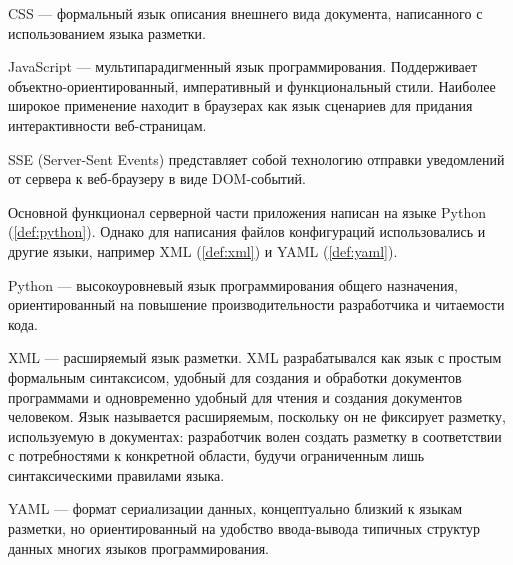 \begin{definition}
    \label{def:css}
    CSS — формальный язык описания внешнего вида документа, написанного с использованием языка разметки.
\end{definition}

\begin{definition}
    \label{def:js}
    JavaScript — мультипарадигменный язык программирования. Поддерживает объектно-ориентированный, императивный и
    функциональный стили. Наиболее широкое применение находит в браузерах как язык сценариев для придания интерактивности
    веб-страницам.
\end{definition}

\begin{definition}
    \label{def:sse}
    SSE (Server-Sent Events) представляет собой технологию отправки уведомлений от сервера к веб-браузеру в виде DOM-событий.
\end{definition}

\noindent Основной функционал серверной части приложения написан на языке Python (\ref{def:python}). Однако для написания
файлов конфигураций использовались и другие языки, например XML (\ref{def:xml}) и YAML (\ref{def:yaml}).

\begin{definition}
    \label{def:python}
    Python — высокоуровневый язык программирования общего назначения, ориентированный на повышение производительности
    разработчика и читаемости кода.
\end{definition}

\begin{definition}
    \label{def:xml}
    XML — расширяемый язык разметки. XML разрабатывался как язык с простым формальным синтаксисом, удобный для создания
    и обработки документов программами и одновременно удобный для чтения и создания документов человеком.
    Язык называется расширяемым, поскольку он не фиксирует разметку, используемую в документах:
    разработчик волен создать разметку в соответствии с потребностями к конкретной области, будучи ограниченным лишь
    синтаксическими правилами языка.
\end{definition}

\begin{definition}
    \label{def:yaml}
    YAML — формат сериализации данных, концептуально близкий к языкам разметки, но ориентированный на удобство
    ввода-вывода типичных структур данных многих языков программирования.
\end{definition}

